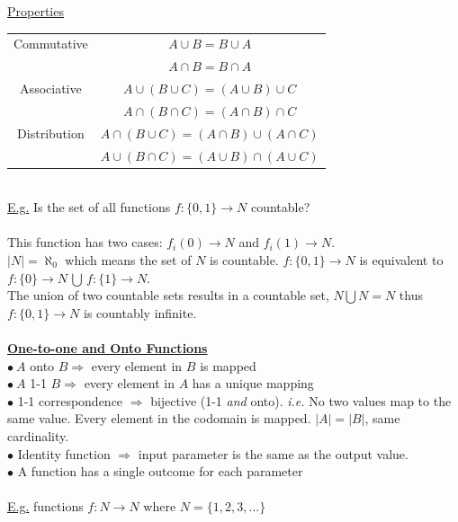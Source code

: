 \documentclass[8pt,letterpaper,twocolumn]{article}
\begin{document}
\underline{Properties}
\begin{tabular}{|c|c|}
\hline
Commutative & $A \cup B = B \cup A$ \\
& $A \cap B = B \cap A$ \\
\hline
Associative & $A \cup (B \cup C) = (A \cup B) \cup C$ \\
& $A \cap (B \cap C) = (A \cap B) \cap C$ \\
\hline
Distribution & $A \cap (B \cup C) = (A \cap B) \cup (A \cap C)$ \\
& $A \cup (B \cap C) = (A \cup B) \cap (A \cup C)$ \\
\hline
\end{tabular}
\\
\underline{E.g.} Is the set of all functions $f:\{0,1\} \rightarrow N$ countable?\\
\\
This function has two cases: $f_i(0) \rightarrow N$ and $f_i(1) \rightarrow N$.\\
$|N| = \aleph_0$ which means the set of $N$ is countable.
$f:\{0,1\} \rightarrow N$ is equivalent to
$f:\{0\} \rightarrow N \, \bigcup \, f:\{1\} \rightarrow N$.\\
The union of two countable sets results in a countable set, $N \bigcup N = N$
thus $f:\{0,1\} \rightarrow N$ is countably infinite.\\
\\
\underline{\textbf{One-to-one and Onto Functions}}\\
$\bullet \: A$ onto $B \Rightarrow$ every element in $B$ is mapped\\
$\bullet \: A$ 1-1 $B \Rightarrow$ every element in $A$ has a unique mapping\\
$\bullet$ 1-1 correspondence $\Rightarrow$ bijective (1-1 \emph{and} onto).
\emph{i.e.} No two values map to the same value.
Every element in the codomain is mapped. $|A| = |B|$, same cardinality.\\
$\bullet$ Identity function $\Rightarrow$ input parameter is the same as the output value.\\
$\bullet$ A function has a single outcome for each parameter\\
\\
\underline{E.g.} functions $f:N \rightarrow N$ where $N = \{1,2,3,\dots\}$
\end{document}
